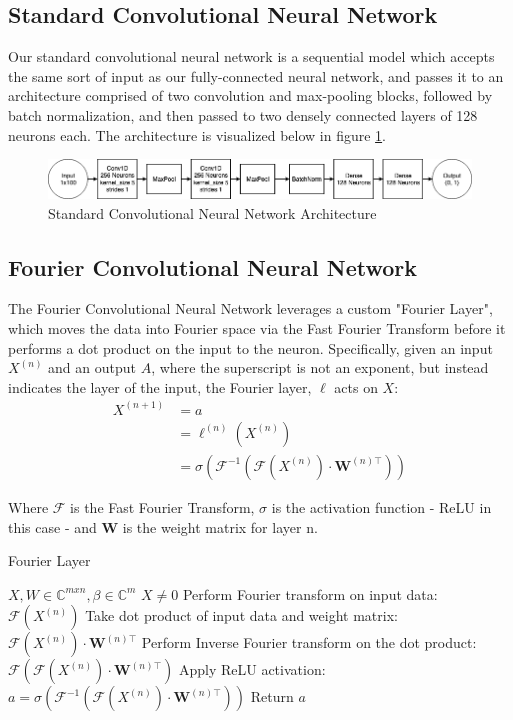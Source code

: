 \documentclass[10pt]{article}
\begin{document}
\subsection{Standard Convolutional Neural Network}
Our standard convolutional neural network is a sequential model which accepts the same sort of input as our fully-connected neural network, and passes it to an architecture comprised of two convolution and max-pooling blocks, followed by batch normalization, and then passed to two densely connected layers of 128 neurons each. The architecture is visualized below in figure \ref{fig:conv net}.

\begin{figure}[ht]
\caption{Standard Convolutional Neural Network Architecture}
\label{fig:conv net}
\includegraphics[width=\textwidth]{conv_architecture}
\centering
\end{figure}

\subsection{Fourier Convolutional Neural Network}
The Fourier Convolutional Neural Network leverages a custom "Fourier Layer", which moves the data into Fourier space via the Fast Fourier Transform before it performs a dot product on the input to the neuron.
Specifically, given an input $X^{(n)}$ and an output $A$, where the superscript is not an exponent, but instead indicates the layer of the input, the Fourier layer, $\ell$ acts on $X$: 
\begin{align*}
X^{(n+1)} & = a \\
& = \ell^{(n)}(X^{(n)}) \\
& = \sigma(\mathcal{F}^{-1}(\mathcal{F}(X^{(n)})\cdot \mathbf{W}^{(n)\top}))
\end{align*}

Where $\mathcal{F}$ is the Fast Fourier Transform, $\sigma$ is the activation function - ReLU in this case - and $\mathbf{W}$ is the weight matrix for layer n.

\begin{algorithm}
\caption{Fourier Layer}
\label{Fourier layer}
\begin{algorithmic}[1]
\REQUIRE $X, W \in \mathbb{C}^{mxn}, \beta \in \mathbb{C}^m$
\ENSURE $X \neq 0$
\STATE Perform Fourier transform on input data: $\mathcal{F}(X^{(n)})$
\STATE Take dot product of input data and weight matrix: $\mathcal{F}(X^{(n)})\cdot \mathbf{W}^{(n)\top}$
\STATE Perform Inverse Fourier transform on the dot product: $\mathcal{F}(\mathcal{F}(X^{(n)})\cdot \mathbf{W}^{(n)\top})$
\STATE Apply ReLU activation: $a = \sigma(\mathcal{F}^{-1}(\mathcal{F}(X^{(n)})\cdot \mathbf{W}^{(n)\top}))$
\STATE Return $a$
\end{algorithmic}
\end{algorithm}
\end{document}
